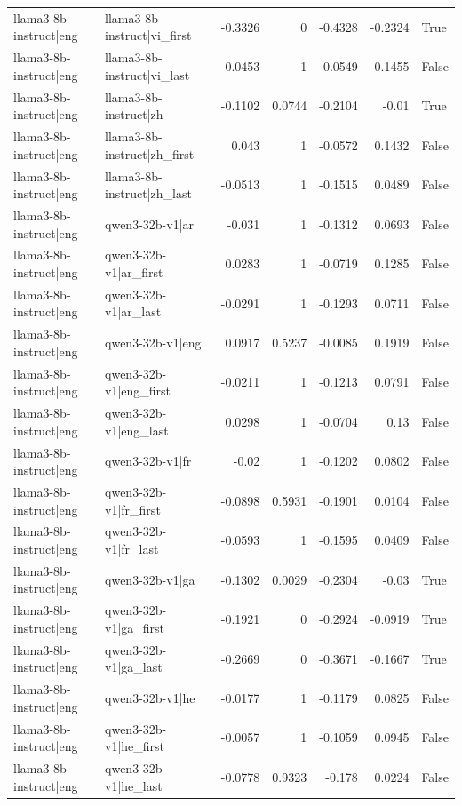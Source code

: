 \begin{table}
\begin{tabular}{l l r r r r l}
llama3-8b-instruct|eng & llama3-8b-instruct|vi_first & -0.3326 & 0 & -0.4328 & -0.2324 & True \\
llama3-8b-instruct|eng & llama3-8b-instruct|vi_last & 0.0453 & 1 & -0.0549 & 0.1455 & False \\
llama3-8b-instruct|eng & llama3-8b-instruct|zh & -0.1102 & 0.0744 & -0.2104 & -0.01 & True \\
llama3-8b-instruct|eng & llama3-8b-instruct|zh_first & 0.043 & 1 & -0.0572 & 0.1432 & False \\
llama3-8b-instruct|eng & llama3-8b-instruct|zh_last & -0.0513 & 1 & -0.1515 & 0.0489 & False \\
llama3-8b-instruct|eng & qwen3-32b-v1|ar & -0.031 & 1 & -0.1312 & 0.0693 & False \\
llama3-8b-instruct|eng & qwen3-32b-v1|ar_first & 0.0283 & 1 & -0.0719 & 0.1285 & False \\
llama3-8b-instruct|eng & qwen3-32b-v1|ar_last & -0.0291 & 1 & -0.1293 & 0.0711 & False \\
llama3-8b-instruct|eng & qwen3-32b-v1|eng & 0.0917 & 0.5237 & -0.0085 & 0.1919 & False \\
llama3-8b-instruct|eng & qwen3-32b-v1|eng_first & -0.0211 & 1 & -0.1213 & 0.0791 & False \\
llama3-8b-instruct|eng & qwen3-32b-v1|eng_last & 0.0298 & 1 & -0.0704 & 0.13 & False \\
llama3-8b-instruct|eng & qwen3-32b-v1|fr & -0.02 & 1 & -0.1202 & 0.0802 & False \\
llama3-8b-instruct|eng & qwen3-32b-v1|fr_first & -0.0898 & 0.5931 & -0.1901 & 0.0104 & False \\
llama3-8b-instruct|eng & qwen3-32b-v1|fr_last & -0.0593 & 1 & -0.1595 & 0.0409 & False \\
llama3-8b-instruct|eng & qwen3-32b-v1|ga & -0.1302 & 0.0029 & -0.2304 & -0.03 & True \\
llama3-8b-instruct|eng & qwen3-32b-v1|ga_first & -0.1921 & 0 & -0.2924 & -0.0919 & True \\
llama3-8b-instruct|eng & qwen3-32b-v1|ga_last & -0.2669 & 0 & -0.3671 & -0.1667 & True \\
llama3-8b-instruct|eng & qwen3-32b-v1|he & -0.0177 & 1 & -0.1179 & 0.0825 & False \\
llama3-8b-instruct|eng & qwen3-32b-v1|he_first & -0.0057 & 1 & -0.1059 & 0.0945 & False \\
llama3-8b-instruct|eng & qwen3-32b-v1|he_last & -0.0778 & 0.9323 & -0.178 & 0.0224 & False \\

\end{tabular}
\end{table}
